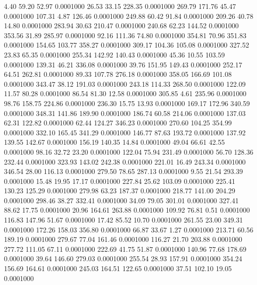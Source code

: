    4.40   59.20   52.97   0.0001000
  26.53   33.15  228.35   0.0001000
 269.79  171.76   45.47   0.0001000
 107.31    4.87  126.46   0.0001000
 249.88   60.42   91.84   0.0001000
 209.26   40.78   14.80   0.0001000
 283.94   30.63  210.47   0.0001000
 240.68   62.23  144.52   0.0001000
 353.56   31.89  285.97   0.0001000
  92.16  111.36   74.80   0.0001000
 354.81   70.96  351.83   0.0001000
 154.65  103.77  358.27   0.0001000
 309.17  104.36  105.08   0.0001000
 327.52   23.83   65.35   0.0001000
 255.34  142.92  140.43   0.0001000
  45.36   10.55  103.59   0.0001000
 139.31   46.21  336.08   0.0001000
  39.76  151.95  149.43   0.0001000
 252.17   64.51  262.81   0.0001000
  89.33  107.78  276.18   0.0001000
 358.05  166.69  101.08   0.0001000
 343.47   38.12  191.03   0.0001000
 243.18  114.33  268.50   0.0001000
 122.09   11.57   80.28   0.0001000
  86.54   81.30   12.58   0.0001000
 305.85    4.61  235.96   0.0001000
  98.76  158.75  224.86   0.0001000
 236.30   15.75   13.93   0.0001000
 169.17  172.96  340.59   0.0001000
 348.31  141.86  189.90   0.0001000
 186.74   60.58  214.06   0.0001000
 137.03   62.31  122.82   0.0001000
  62.44  124.27  346.23   0.0001000
 270.60  104.25  354.99   0.0001000
 332.10  165.45  341.29   0.0001000
 146.77   87.63  193.72   0.0001000
 137.92  139.55  142.67   0.0001000
 156.19  140.35   14.84   0.0001000
  49.04   66.61   42.55   0.0001000
  98.16   32.72   23.20   0.0001000
 122.04   75.94  231.49   0.0001000
  56.70  128.36  232.44   0.0001000
 323.93  143.02  242.38   0.0001000
 221.01   16.49  243.34   0.0001000
 346.54   28.00  116.13   0.0001000
 279.50   78.65  287.13   0.0001000
   9.55   21.54  293.39   0.0001000
  15.48   19.95   17.17   0.0001000
 227.84   25.62  103.09   0.0001000
 225.41  130.23  125.29   0.0001000
 279.98   63.23  187.37   0.0001000
 218.77  141.00  204.29   0.0001000
 298.46   38.27  332.41   0.0001000
  34.09   79.05  301.01   0.0001000
 327.41   88.62   17.75   0.0001000
  20.96  164.61  263.88   0.0001000
 109.92   76.81    0.51   0.0001000
 116.83  147.96   51.67   0.0001000
  17.42   85.52   10.70   0.0001000
 261.55   23.00  349.31   0.0001000
 172.26  158.03  356.80   0.0001000
  66.87   33.67    1.27   0.0001000
 213.71   60.56  189.19   0.0001000
 279.67   77.04  161.46   0.0001000
 116.27   21.70  203.88   0.0001000
 277.72  111.05   67.11   0.0001000
 222.69   41.75   51.87   0.0001000
 140.96   77.68  178.69   0.0001000
  39.64  146.60  279.03   0.0001000
 255.54   28.93  157.91   0.0001000
 354.24  156.69  164.61   0.0001000
 245.03  164.51  122.65   0.0001000
  37.51  102.10   19.05   0.0001000

